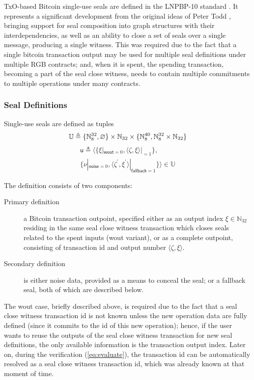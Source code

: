 \documentclass[9pt,oneside]{amsart}
\begin{document}
\begin{multicols}{2}
TxO-based Bitcoin single-use seals are defined in the LNPBP-10 standard \cite{LNPBP10}.
It represents a significant development from the original ideas of Peter Todd \cite{SUS1, SUS2},
bringing support for seal composition into graph structures with their interdependencies,
as well as an ability to close a set of seals over a single message, producing a single witness.
This was required due to the fact that a single bitcoin transaction output may be used
for multiple seal definitions under multiple RGB contracts;
and, when it is spent, the spending transaction, becoming a part of the \gls{seal close witness},
needs to contain multiple commitments to multiple operations under many contracts.

\subsubsection{Seal Definitions}

Single-use seals are defined as tuples
\noindent
\begin{equation}
    \mathbb{U} \triangleq \{ \mathbb{N}_8^{32}, \varnothing \} \times \mathbb{N}_{32} \times \{ \mathbb{N}_8^{40}, \mathbb{N}_8^{32} \times \mathbb{N}_{32} \} \\
\end{equation}
\begin{multline}
    \mathsf{u} \triangleq \big\langle \{\xi|_{\mathsf{wout}=0}, \langle \zeta, \xi\rangle|_{=1} \}, \\
        \{\nu|_{\mathsf{noise}=0}, \langle \zeta^\prime, \xi^\prime\rangle|_{\mathsf{fallback}=1} \} \big\rangle \in \mathbb{U}
\end{multline}

The definition consists of two components:
\begin{description}
\item[Primary definition] a Bitcoin transaction outpoint,
    specified either as an output index $\xi \in \mathbb{N}_{32}$
    residing in the same \gls{seal close witness transaction} which closes seals related to the spent inputs
    (\textsf{wout} variant), or as a complete outpoint,
    consisting of transaction id and output number $\langle \zeta, \xi\rangle$.
\item[Secondary definition] is either noise data, provided as a means to conceal the seal;
    or a \gls{fallback seal}, both of which are described below.
\end{description}

The \textsf{wout} case, briefly described above, is required due to the fact that
a \gls{seal close witness transaction} id is not known unless the new operation data are fully defined
(since it commits to the id of this new operation);
hence, if the user wants to reuse the outputs of
the \gls{seal close witness transaction} for new seal definitions,
the only available information is the transaction output index.
Later on, during the verification (\ref{eq:evaluate}),
the transaction id can be automatically resolved
as a \gls{seal close witness transaction} id,
which was already known at that moment of time.


\end{multicols}
\end{document}
